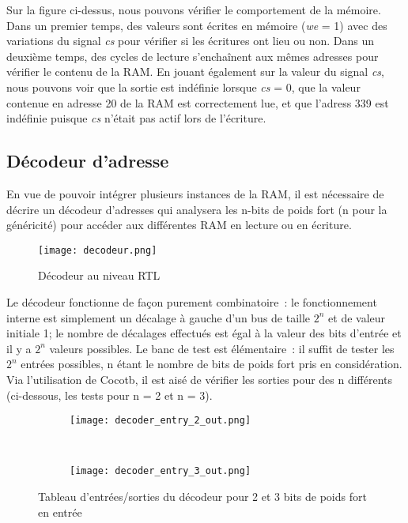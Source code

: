 \indent Sur la figure ci-dessus, nous pouvons vérifier le comportement de la mémoire.
Dans un premier temps, des valeurs sont écrites en mémoire (\textit{we} = 1) avec des variations du signal \textit{cs} pour vérifier si les écritures ont lieu ou non.
Dans un deuxième temps, des cycles de lecture s'enchaînent aux mêmes adresses pour vérifier le contenu de la RAM.
En jouant également sur la valeur du signal \textit{cs}, nous pouvons voir que la sortie est indéfinie lorsque \textit{cs} = 0, que la valeur contenue en adresse 20 de la RAM est correctement lue, et que l'adress 339 est indéfinie puisque \textit{cs} n'était pas actif lors de l'écriture.

\subsection{Décodeur d'adresse}

\indent En vue de pouvoir intégrer plusieurs instances de la RAM, il est nécessaire de décrire un décodeur d'adresses qui analysera les n-bits de poids fort (n pour la généricité) pour accéder aux différentes RAM en lecture ou en écriture.

\begin{figure}[h]
	\centering
	\texttt{[image: decodeur.png]}
	\caption{Décodeur au niveau RTL}
	\label{fig:synth_bloc_decodeur}
\end{figure}

\indent Le décodeur fonctionne de façon purement combinatoire : le fonctionnement interne est simplement un décalage à gauche d'un bus de taille $ 2^{n} $ et de valeur initiale 1; le nombre de décalages effectués est égal à la valeur des bits d'entrée et il y a $ 2^{n} $ valeurs possibles.
Le banc de test est élémentaire : il suffit de tester les $ 2^{n} $ entrées possibles, n étant le nombre de bits de poids fort pris en considération. Via l'utilisation de Cocotb, il est aisé de vérifier les sorties pour des n différents (ci-dessous, les tests pour n = 2 et n = 3).

\begin{figure}[h]
	\centering
	\begin{subfigure}{0.3\textwidth}
		\texttt{[image: decoder\_entry\_2\_out.png]} 
	\end{subfigure}
	\, \, \, \,
	\begin{subfigure}{0.3\textwidth}
		\texttt{[image: decoder\_entry\_3\_out.png]}
	\end{subfigure}
	\caption{Tableau d'entrées/sorties du décodeur pour 2 et 3 bits de poids fort en entrée}
	\label{fig:stdout_decoder_2_3}
\end{figure}


